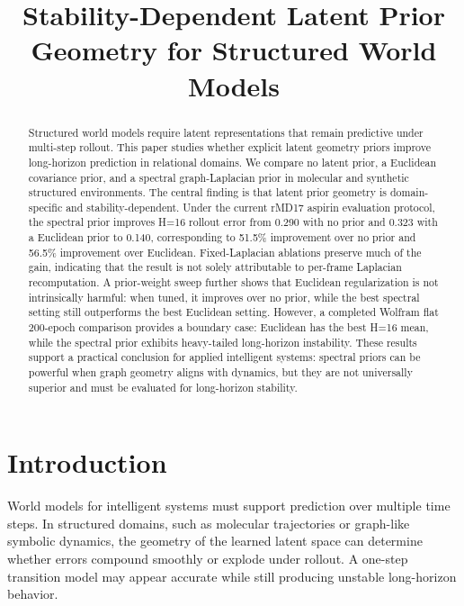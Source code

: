 \documentclass[pdflatex,sn-mathphys-num]{sn-jnl}
\title[Stability-Dependent Latent Prior Geometry]{Stability-Dependent Latent Prior Geometry for Structured World Models}
\author*[1]{\fnm{AUTHOR\_NAMES\_TO\_FILL}}
\affil*[1]{\orgdiv{AFFILIATIONS\_TO\_FILL}}
\begin{document}
\maketitle

\begin{abstract}
Structured world models require latent representations that remain predictive under multi-step rollout. This paper studies whether explicit latent geometry priors improve long-horizon prediction in relational domains. We compare no latent prior, a Euclidean covariance prior, and a spectral graph-Laplacian prior in molecular and synthetic structured environments. The central finding is that latent prior geometry is domain-specific and stability-dependent. Under the current rMD17 aspirin evaluation protocol, the spectral prior improves H=16 rollout error from 0.290 with no prior and 0.323 with a Euclidean prior to 0.140, corresponding to 51.5\% improvement over no prior and 56.5\% improvement over Euclidean. Fixed-Laplacian ablations preserve much of the gain, indicating that the result is not solely attributable to per-frame Laplacian recomputation. A prior-weight sweep further shows that Euclidean regularization is not intrinsically harmful: when tuned, it improves over no prior, while the best spectral setting still outperforms the best Euclidean setting. However, a completed Wolfram flat 200-epoch comparison provides a boundary case: Euclidean has the best H=16 mean, while the spectral prior exhibits heavy-tailed long-horizon instability. These results support a practical conclusion for applied intelligent systems: spectral priors can be powerful when graph geometry aligns with dynamics, but they are not universally superior and must be evaluated for long-horizon stability.
\end{abstract}


\section{Introduction}

World models for intelligent systems must support prediction over multiple time steps. In structured domains, such as molecular trajectories or graph-like symbolic dynamics, the geometry of the learned latent space can determine whether errors compound smoothly or explode under rollout. A one-step transition model may appear accurate while still producing unstable long-horizon behavior.
\end{document}
